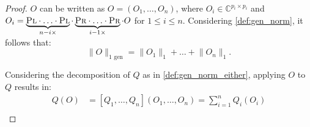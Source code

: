 \begin{proof}
  $O$ can be written as  $O = (O_1, \ldots, O_n)$, where  $O_{i} \in \mathbb{C}^{p_i \times p_i}$ and $O_i =  \underbrace{\textsc{Pl} \cdot \ldots \cdot \textsc{Pl}}_{n-i \times} \cdot \underbrace{\textsc{Pr} \cdot \ldots \cdot \textsc{Pr}}_{i-1 \times} \cdot O $ for $1 \leq i \leq n $. Considering \autoref{def:gen_norm}, it follows that: 
\begin{equation}
  \lVert O  \rVert_{1 \text{ gen}} =   \lVert O_1 \rVert_{1} + \ldots + \lVert O_n \rVert_{1}.
\end{equation}

Considering the decomposition of $Q$ as in \autoref{def:gen_norm_either}, applying $O$ to $Q$ results in:
\begin{equation}
\begin{split}
Q(O) & = [Q_1, \ldots, Q_n] (O_1, \ldots, O_n) =  \sum_{i=1}^{n} Q_i(O_i) \\
\end{split}
\end{equation}


\end{proof}
